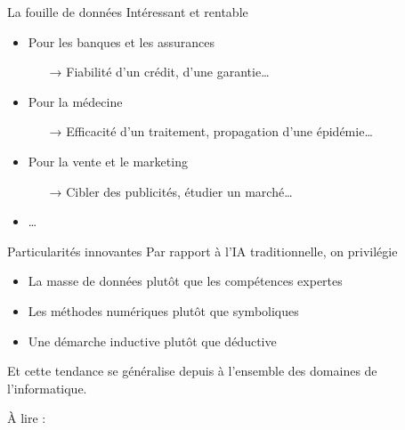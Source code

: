 \documentclass[hyperref={unicode}, xcolor={svgnames}]{beamer}
\begin{document}
\begin{frame}{La fouille de données}
    Intéressant et rentable
    \begin{itemize}
        \item Pour les banques et les assurances
            \begin{itemize}
                \item[→] Fiabilité d'un crédit, d'une garantie…
            \end{itemize}
        \item Pour la médecine
            \begin{itemize}
                \item[→] Efficacité d'un traitement, propagation d'une épidémie…
            \end{itemize}
        \item Pour la vente et le marketing
            \begin{itemize}
                \item[→] Cibler des publicités, étudier un marché…
            \end{itemize}
        \item …
    \end{itemize}
\end{frame}

\begin{frame}{Particularités innovantes}
    Par rapport à l'IA traditionnelle, on privilégie
    \begin{itemize}
        \item \alert{La masse de données} plutôt que les compétences expertes
        \item \alert{Les méthodes numériques} plutôt que symboliques
        \item Une démarche \alert{inductive} plutôt que déductive
    \end{itemize}
    Et cette tendance se généralise depuis à l'ensemble des domaines de l'informatique.

    À lire :  \parencite{church2011pendulum}
\end{frame}
\end{document}
